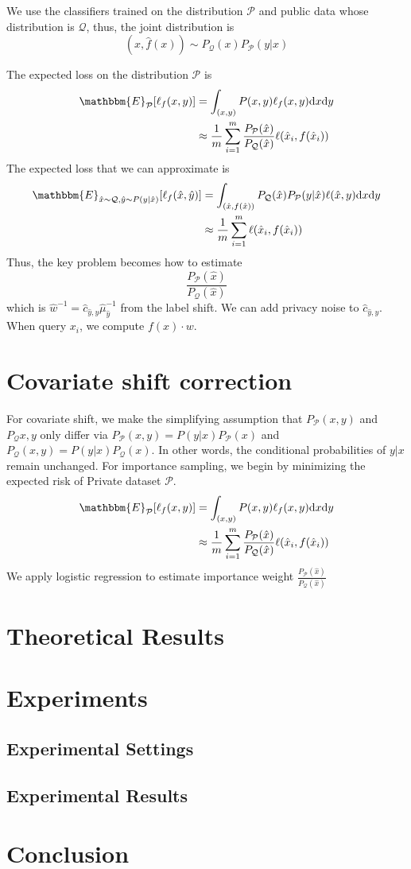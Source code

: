 \documentclass{article}
\theoremstyle{definition}
\def\cP{\mathcal{P}}
\def\cQ{\mathcal{Q}}
\begin{document}
We use the classifiers trained on the distribution $\mathcal{P}$ and public data whose distribution is $\mathcal{Q}$, thus, the joint distribution is
\[
(x,\hat{f}(x))\sim P_\mathcal{Q}(x)P_\mathcal{P}(y|x)
\]

The expected loss on the distribution $\mathcal{P}$ is
\begin{align*}
\mathbbm{E}_{\mathcal{P}}[\ell_f(x,y)]&=\int_{(x,y)}P(x,y)\ell_f(x,y){\rm d}x{\rm d}y\\
&\approx \frac{1}{m}\sum_{i=1}^m \frac{P_\mathcal{P}(\hat{x})}{P_\mathcal{Q}(\hat{x})}\ell(\hat{x}_i,f(\hat{x}_i))
\end{align*}
The expected loss that we can approximate is
\begin{align*}
\mathbbm{E}_{\hat{x}\sim \mathcal{Q},\hat{y}\sim P(y|\hat{x})}[\ell_f(\hat{x},\hat{y})]&=\int_{(\hat{x},f(\hat{x}))}P_\mathcal{Q}(\hat{x})P_\mathcal{P}(y|\hat{x})\ell(\hat{x},y){\rm d}x{\rm d}y\\
&\approx \frac{1}{m}\sum_{i=1}^{m}\ell(\hat{x}_i,f(\hat{x}_i))
\end{align*}
Thus, the key problem becomes how to estimate
\[
\frac{P_\mathcal{P}(\hat{x})}{P_\mathcal{Q}(\hat{x})}
\]
which is $\hat{w}^{-1}=\hat{c}_{\hat{y},y}\hat{\mu}^{-1}_{\hat{y}}$ from the label shift. We can add privacy noise to $\hat{c}_{\hat{y},y}$. When query $x_i$, we compute $f(x)\cdot w$.

\section{Covariate shift correction}
For covariate shift, we make the simplifying assumption that $P_{\cP}(x,y)$ and $P_{\cQ}{x,y}$ only differ via $P_{\cP}(x,y) = P(y|x)P_{\cP}(x)$ and $P_{\cQ}(x,y) = P(y|x)P_{\cQ}(x)$. In other words, the conditional probabilities of $y|x$ remain unchanged. For importance sampling, we begin by minimizing the expected risk of Private dataset $\cP$.
\begin{align*}
\mathbbm{E}_{\mathcal{P}}[\ell_f(x,y)]&=\int_{(x,y)}P(x,y)\ell_f(x,y){\rm d}x{\rm d}y\\
&\approx \frac{1}{m}\sum_{i=1}^m \frac{P_\mathcal{P}(\hat{x})}{P_\mathcal{Q}(\hat{x})}\ell(\hat{x}_i,f(\hat{x}_i))
\end{align*}
We apply logistic regression to estimate importance weight $\frac{P_\mathcal{P}(\hat{x})}{P_\mathcal{Q}(\hat{x})}$
\section{Theoretical Results}

\section{Experiments}
\subsection{Experimental Settings}

\subsection{Experimental Results}

\section{Conclusion}



\end{document}
